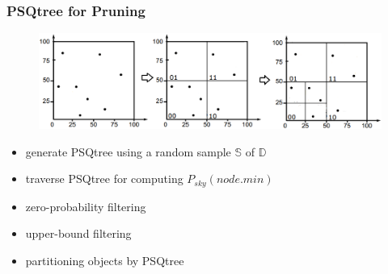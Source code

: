 \documentclass{beamer}
\begin{document}
\begin{frame}
\frametitle{PSQtree for Pruning}
\begin{figure}[htpb]
  \begin{center}
	\includegraphics[width=\linewidth]{PSQtree.png}
  \end{center}
\end{figure}

\begin{itemize}
\item generate PSQtree using a random sample $\mathbb{S}$ of $\mathbb{D}$
\item traverse PSQtree for computing $P_{sky}(node.min)$
\item zero-probability filtering
\item upper-bound filtering
\item partitioning objects by PSQtree
\end{itemize}
\end{frame}
\end{document}
